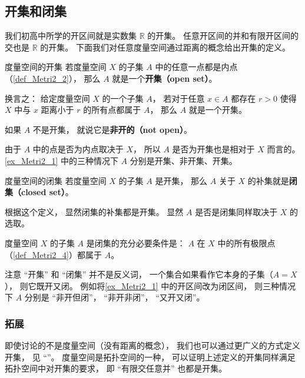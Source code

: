 
\subsection{开集和闭集}
我们初高中所学的开区间就是实数集 $\mathbb R$ 的开集。 任意开区间的并和有限开区间的交也是 $\mathbb R$ 的开集。 下面我们对任意度量空间通过距离的概念给出开集的定义。

\begin{definition}{度量空间的开集}
若度量空间 $X$ 的子集 $A$ 中的任意一点都是内点（\autoref{def_Metri2_2}）， 那么 $A$ 就是一个\textbf{开集（open set）}。

换言之： 给定度量空间 $X$ 的一个子集 $A$， 若对于任意 $x \in A$ 都存在 $r > 0$ 使得 $X$ 中与 $x$ 距离小于 $r$ 的所有点都属于 $A$， 那么 $A$ 就是一个开集。

如果 $A$ 不是开集， 就说它是\textbf{非开的（not open）}。
\end{definition}
由于 $A$ 中的点是否为内点取决于 $X$， 所以 $A$ 是否为开集也是相对于 $X$ 而言的。 \autoref{ex_Metri2_1} 中的三种情况下 $A$ 分别是开集、非开集、开集。

\begin{definition}{度量空间的闭集}
若度量空间 $X$ 的子集 $A$ 是开集， 那么 $A$ 关于 $X$ 的补集就是\textbf{闭集（closed set）}。
\end{definition}
根据这个定义， 显然闭集的补集都是开集。 显然 $A$ 是否是闭集同样取决于 $X$ 的选取。

\begin{theorem}{}
度量空间 $X$ 的子集 $A$ 是闭集的充分必要条件是： $A$ 在 $X$ 中的所有极限点（\autoref{def_Metri2_4}）都属于 $A$。
\end{theorem}
注意 “开集” 和 “闭集” 并不是反义词， 一个集合如果看作它本身的子集（$A = X$）， 则它既开又闭。 例如将\autoref{ex_Metri2_1} 中的开区间改为闭区间， 则三种情况下 $A$ 分别是 “非开但闭”， “非开非闭”， “又开又闭”。

\subsubsection{拓展}
即使讨论的不是度量空间（没有距离的概念）， 我们也可以通过更广义的方式定义开集， 见 “”。 度量空间是拓扑空间的一种， 可以证明上述定义的开集同样满足拓扑空间中对开集的要求， 即 “有限交任意并” 也都是开集。
